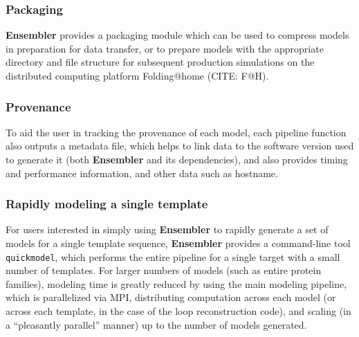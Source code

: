 \documentclass[aps,pre,twocolumn,nofootinbib,superscriptaddress,linenumbers]{revtex4-1}
\begin{document}
\subsubsection{Packaging}

{\bf Ensembler} provides a packaging module which can be used to compress models in preparation for data transfer, or to prepare models with the appropriate directory and file structure for subsequent production simulations on the distributed computing platform Folding@home (CITE: F@H).

\subsubsection{Provenance}

To aid the user in tracking the provenance of each model, each pipeline function also outputs a metadata file, which helps to link data to the software version used to generate it (both {\bf Ensembler} and its dependencies), and also provides timing and performance information, and other data such as hostname.

\subsubsection{Rapidly modeling a single template}

For users interested in simply using {\bf Ensembler} to rapidly generate a set of models for a single template sequence, {\bf Ensembler} provides a command-line tool {\tt quickmodel}, which performs the entire pipeline for a single target with a small number of templates.
For larger numbers of models (such as entire protein families), modeling time is greatly reduced by using the main modeling pipeline, which is parallelized via MPI, distributing computation across each model (or across each template, in the case of the loop reconstruction code), and scaling (in a ``pleasantly parallel'' manner) up to the number of models generated.





\end{document}
